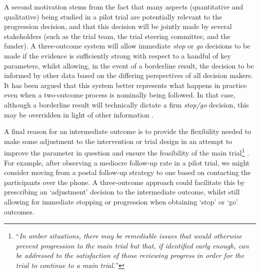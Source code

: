 \documentclass{bmcart}
\begin{document}

A second motivation stems from the fact that many aspects (quantitative and qualitative) being studied in a pilot trial are potentially relevant to the progression decision, and that this decision will be jointly made by several stakeholders (such as the trial team, the trial steering committee, and the funder). A three-outcome system will allow immediate \emph{stop} or \emph{go} decisions to be made if the evidence is sufficiently strong with respect to a handful of key parameters, whilst allowing, in the event of a borderline result, the decision to be informed by other data based on the differing perspectives of all decision makers. It has been argued that this system better represents what happens in practice even when a two-outcome process is nominally being followed. In that case, although a borderline result will technically dictate a firm \emph{stop/go} decision, this may be overridden in light of other information \cite{Sargent2001}.

A final reason for an intermediate outcome is to provide the flexibility needed to make some adjustment to the intervention or trial design in an attempt to improve the parameter in question and ensure the feasibility of the main trial\footnote{``\emph{In amber situations, there may be remediable issues that would otherwise prevent progression to the main trial but that, if identified early enough, can be addressed to the satisfaction of those reviewing progress in order for the trial to continue to a main trial.}''} \cite{Avery2017}. For example, after observing a mediocre follow-up rate in a pilot trial, we might consider moving from a postal follow-up strategy to one based on contacting the participants over the phone. A three-outcome approach could facilitate this by prescribing an `adjustment' decision to the intermediate outcome, whilst still allowing for immediate stopping or progression when obtaining `stop' or `go' outcomes. 
\end{document}
